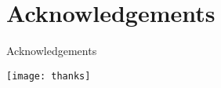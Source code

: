 \section*{Acknowledgements}
\begin{frame}{Acknowledgements}
    \begin{center}
        \texttt{[image: thanks]}
    \end{center}
\end{frame}